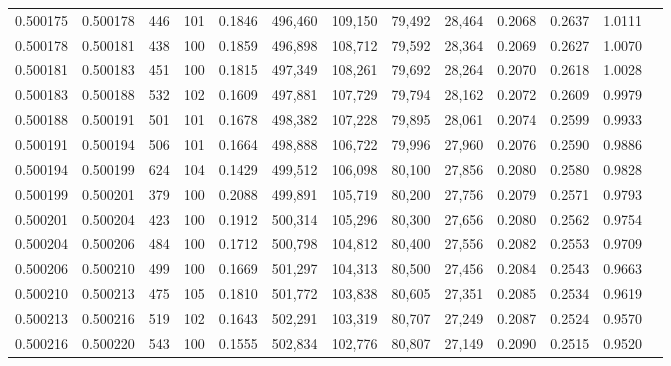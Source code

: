 \begin{tabular}{rrrrrrrrrrrrr}
0.500175 & 0.500178 &   446 & 101 &                                     0.1846 & 496,460 & 109,150 &  79,492 &  28,464 & 0.2068 & 0.2637 & 1.0111 \\
0.500178 & 0.500181 &   438 & 100 &                                     0.1859 & 496,898 & 108,712 &  79,592 &  28,364 & 0.2069 & 0.2627 & 1.0070 \\
0.500181 & 0.500183 &   451 & 100 &                                     0.1815 & 497,349 & 108,261 &  79,692 &  28,264 & 0.2070 & 0.2618 & 1.0028 \\
0.500183 & 0.500188 &   532 & 102 &                                     0.1609 & 497,881 & 107,729 &  79,794 &  28,162 & 0.2072 & 0.2609 & 0.9979 \\
0.500188 & 0.500191 &   501 & 101 &                                     0.1678 & 498,382 & 107,228 &  79,895 &  28,061 & 0.2074 & 0.2599 & 0.9933 \\
0.500191 & 0.500194 &   506 & 101 &                                     0.1664 & 498,888 & 106,722 &  79,996 &  27,960 & 0.2076 & 0.2590 & 0.9886 \\
0.500194 & 0.500199 &   624 & 104 &                                     0.1429 & 499,512 & 106,098 &  80,100 &  27,856 & 0.2080 & 0.2580 & 0.9828 \\
0.500199 & 0.500201 &   379 & 100 &                                     0.2088 & 499,891 & 105,719 &  80,200 &  27,756 & 0.2079 & 0.2571 & 0.9793 \\
0.500201 & 0.500204 &   423 & 100 &                                     0.1912 & 500,314 & 105,296 &  80,300 &  27,656 & 0.2080 & 0.2562 & 0.9754 \\
0.500204 & 0.500206 &   484 & 100 &                                     0.1712 & 500,798 & 104,812 &  80,400 &  27,556 & 0.2082 & 0.2553 & 0.9709 \\
0.500206 & 0.500210 &   499 & 100 &                                     0.1669 & 501,297 & 104,313 &  80,500 &  27,456 & 0.2084 & 0.2543 & 0.9663 \\
0.500210 & 0.500213 &   475 & 105 &                                     0.1810 & 501,772 & 103,838 &  80,605 &  27,351 & 0.2085 & 0.2534 & 0.9619 \\
0.500213 & 0.500216 &   519 & 102 &                                     0.1643 & 502,291 & 103,319 &  80,707 &  27,249 & 0.2087 & 0.2524 & 0.9570 \\
0.500216 & 0.500220 &   543 & 100 &                                     0.1555 & 502,834 & 102,776 &  80,807 &  27,149 & 0.2090 & 0.2515 & 0.9520 \\

\end{tabular}
